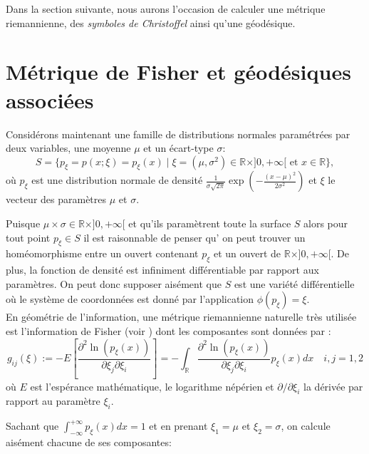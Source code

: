 \documentclass[11pt, letterpaper]{article}
\begin{document}
	Dans la section suivante, nous aurons l'occasion de calculer une métrique riemannienne, des \textit{symboles de Christoffel} ainsi qu'une géodésique.\\
	
	
	\section{Métrique de Fisher et géodésiques associées} 
	Considérons maintenant une famille de distributions normales paramétrées par deux variables, une moyenne $\mu$ et un écart-type $\sigma$:
	\begin{equation}\label{my_manifold}
		S=\{p_{\xi}=p(x;\xi)=p_{\xi}(x) \mid \xi=(\mu, \sigma^2)\in\mathbb{R} \times ]{ 0,+\infty[} \text{ et } x\in\mathbb{R}\}, 
	\end{equation}
	où $p_{\xi}$ est une distribution normale de densité $\frac{1}{\sigma\sqrt{2\pi}}\exp\left(-\frac{(x-\mu)^2}{2\sigma^2}\right)$ et $\xi$ le vecteur des paramètres $\mu$ et $\sigma$. 
	
	Puisque $\mu\times\sigma\in\mathbb{R} \times ]{0,+\infty[}$ et qu'ils paramètrent toute la surface $S$ alors pour tout point $p_{\xi}\in S$ il est raisonnable de penser qu'  on peut trouver un homéomorphisme entre un ouvert contenant $p_{\xi}$ et un ouvert de $\mathbb{R} \times ]{0,+\infty[}$. De plus, la fonction de densité est infiniment différentiable par rapport aux paramètres. On peut donc supposer aisément que $S$ est une variété différentielle où le système de coordonnées est donné par l'application $\phi(p_{\xi})=\xi$.\\
	
	En géométrie de l'information, une métrique riemannienne naturelle très utilisée est l'information de Fisher (voir \cite[Proposition 1.7.1]{calin2014geometric}) dont les composantes sont données par  :
	\begin{equation*}
		g_{ij}(\xi):= -E\left[\frac{\partial^2\ln(p_{\xi}(x))}{\partial\xi_j\partial\xi_i}\right]=-\int_{\mathbb{R}}\frac{\partial^2\ln(p_{\xi}(x))}{\partial\xi_j\partial\xi_i}p_{\xi}(x)dx \quad i,j=1,2
	\end{equation*}  
	où $E$ est l'espérance mathématique,  le logarithme népérien et $\partial/\partial\xi_i$ la dérivée par rapport au paramètre $\xi_i$.
	
	Sachant que $\int_{-\infty}^{+\infty}p_{\xi}(x)dx=1$ et en prenant $\xi_1=\mu$ et $\xi_2=\sigma$, on calcule aisément chacune de ses composantes:
	
\end{document}
